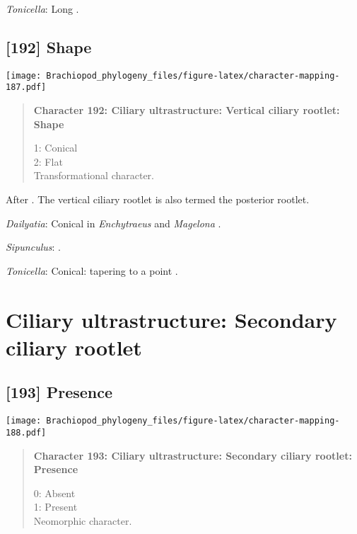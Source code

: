 \documentclass[openany]{book}
\theoremstyle{definition}
\theoremstyle{definition}
\theoremstyle{definition}
\theoremstyle{remark}
\begin{document}
\hypertarget{Tonicella-coding-191}{}
\emph{Tonicella}: Long \citep{Luter1995}.

\subsection*{{[}192{]} Shape}\label{shape}

\texttt{[image: Brachiopod\_phylogeny\_files/figure-latex/character-mapping-187.pdf]}

\begin{quote}
\textbf{Character 192: Ciliary ultrastructure: Vertical ciliary rootlet:
Shape}

1: Conical\\
2: Flat\\
Transformational character.
\end{quote}

After \citet{Lundin2009}. The vertical ciliary rootlet is also termed
the posterior rootlet.

\hypertarget{Dailyatia-coding-192}{}
\emph{Dailyatia}: Conical in \emph{Enchytraeus} \citep{Reger1967} and
\emph{Magelona} \citep{Bartolomaeus1995}.

\hypertarget{Sipunculus-coding-192}{}
\emph{Sipunculus}: \citet{Reed1982}.

\hypertarget{Tonicella-coding-192}{}
\emph{Tonicella}: Conical: tapering to a point \citep{Luter1995}.

\section{Ciliary ultrastructure: Secondary ciliary
rootlet}\label{ciliary-ultrastructure-secondary-ciliary-rootlet}

\subsection*{{[}193{]} Presence}\label{presence-4}

\texttt{[image: Brachiopod\_phylogeny\_files/figure-latex/character-mapping-188.pdf]}

\begin{quote}
\textbf{Character 193: Ciliary ultrastructure: Secondary ciliary
rootlet: Presence}

0: Absent\\
1: Present\\
Neomorphic character.
\end{quote}
\end{document}
